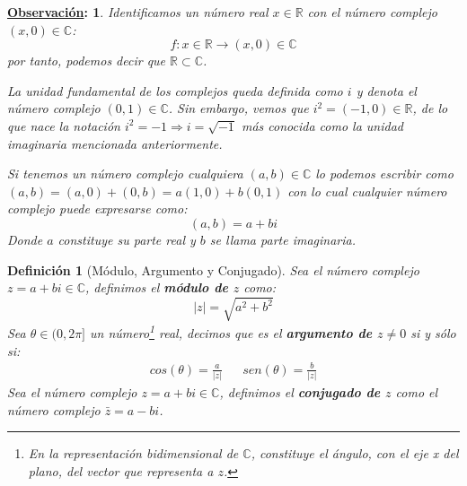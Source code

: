 \documentclass[10pt,a4paper,openright]{book}
\theoremstyle{break}
\newtheorem*{defi}{Definición}
\newtheorem*{obs}{\underline{Observación}:}
\begin{document}
\begin{obs}
Identificamos un número real $x\in \mathbb R$ con el número complejo $(x,0)\in \mathbb C$:
$$f: x\in \mathbb R \rightarrow (x,0)\in \mathbb C$$
por tanto, podemos decir que $\mathbb{R}\subset \mathbb{C}$.

La unidad fundamental de los complejos queda definida como $i$ y denota el número complejo $(0,1)\in \mathbb C$. Sin embargo, vemos que $i^2=(-1,0)\in \mathbb R$, de lo que nace la notación $i^2=-1\Rightarrow i=\sqrt{-1}$ más conocida como la unidad imaginaria mencionada anteriormente.

Si tenemos un número complejo cualquiera $(a,b)\in \mathbb C$ lo podemos escribir como $(a,b)=(a,0)+(0,b)=a(1,0)+b(0,1)$ con lo cual cualquier número complejo puede expresarse como:
$$(a,b)=a+bi$$
Donde $a$ constituye su parte real y $b$ se llama parte imaginaria.
\end{obs}

\begin{defi}[Módulo, Argumento y Conjugado]
Sea el número complejo $z=a+bi\in \mathbb C$, definimos el \textbf{módulo de $z$} como:
$$|z|=\sqrt{a^2+b^2}$$
Sea $\theta\in (0,2\pi]$ un número\footnote{En la representación bidimensional de $\mathbb{C}$, constituye el ángulo, con el eje x del plano, del vector que representa a $z$.} real, decimos que es el \textbf{argumento de $z\neq 0$} si y sólo si:
\begin{align*}
cos(\theta)=\frac{a}{|z|} & & sen(\theta)=\frac{b}{|z|}
\end{align*}
Sea el número complejo $z=a+bi\in \mathbb C$, definimos el \textbf{conjugado de $z$} como el número complejo $\bar{z}=a-bi$.
\end{defi}
\end{document}
